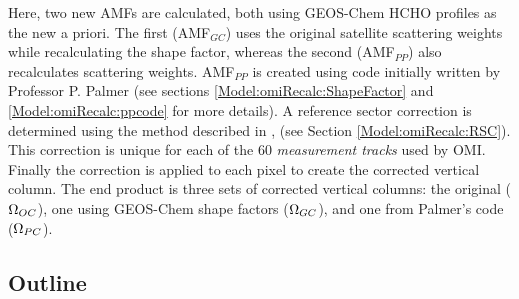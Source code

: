   Here, two new AMFs are calculated, both using GEOS-Chem HCHO profiles as the new a priori. 
  The first (AMF$_{GC}$) uses the original satellite scattering weights while recalculating the shape factor, whereas the second (AMF$_{PP}$) also recalculates scattering weights.
  AMF$_{PP}$ is created using code initially written by Professor P. Palmer (see sections \ref{Model:omiRecalc:ShapeFactor} and \ref{Model:omiRecalc:ppcode} for more details).
  A reference sector correction is determined using the method described in \textcite{Abad2016}, (see Section \ref{Model:omiRecalc:RSC}).
  This correction is unique for each of the 60 \textit{measurement tracks} used by OMI.
  Finally the correction is applied to each pixel to create the corrected vertical column. 
  The end product is three sets of corrected vertical columns: the original ($\Omega_{OC}$), one using GEOS-Chem shape factors ($\Omega_{GC}$), and one from Palmer's code ($\Omega_{PC}$).
  
  \subsection{Outline}
    \label{Model:omiRecalc:outline}
    
